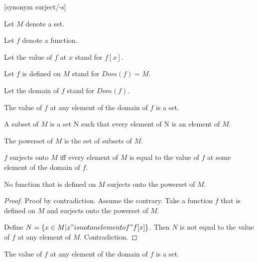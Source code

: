 \documentclass[a4paper,draft]{amsproc}
\begin{document}
\begin{forthel}

[synonym surject/-s]

Let $M$ denote a set.

Let $f$ denote a function.

Let the value of $f$ at $x$ stand for $f[x]$.

Let $f$ is defined on $M$ stand for $Dom(f) = M$.

Let the domain of $f$ stand for $Dom(f)$.


\begin{axiom}
The value of $f$ at any element of the domain of $f$ is a set.
\end{axiom}

\begin{definition}[subset]
A subset of $M$ is a set N such that every element of N is an element of $M$.
\end{definition}

\begin{definition}
The powerset of $M$ is the set of subsets of $M$.
\end{definition}

\begin{definition}
$f$ surjects onto $M$ iff every element of $M$ is equal to the value of $f$ at some element of the domain of $f$.
\end{definition}

\begin{proposition}
No function that is defined on $M$ surjects onto the powerset of $M$.
\end{proposition}
\begin{proof}
Proof by contradiction.
Assume the contrary. Take a function $f$ that is defined on $M$ and surjects onto the powerset of $M$.

Define $N = \{ x \in M | x "is not an element of" f[x] \}$.
Then $N$ is not equal to the value of $f$ at any element of $M$.
Contradiction.
\end{proof}

\begin{theorem}
The value of $f$ at any element of the domain of $f$ is a set.
\end{theorem}

\end{forthel}
\end{document}
